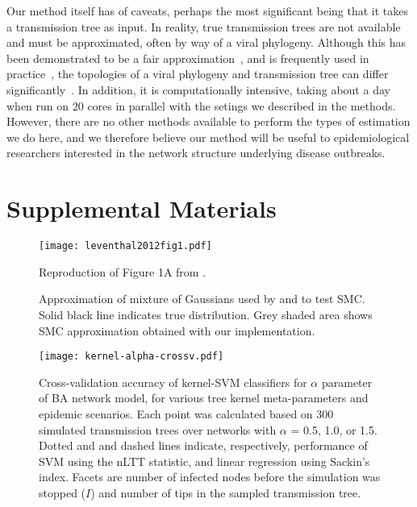 \documentclass[12pt]{article}\usepackage[]{graphicx}\usepackage[]{color}
\begin{document}
Our method itself has of caveats, perhaps the most significant being that it
takes a transmission tree as input. In reality, true transmission trees are not
available and must be approximated, often by way of a viral phylogeny. Although
this has been demonstrated to be a fair
approximation~\autocite[e.g.][]{leitner1996accurate}, and is frequently used in
practice~\autocite[e.g.][]{stadler2013uncovering}, the topologies of a viral
phylogeny and transmission tree can differ
significantly~\autocite{ypma2013relating}. In addition, it is computationally
intensive, taking about a day when run on 20 cores in parallel with the setings
we described in the methods. However, there are no other methods available to
perform the types of estimation we do here, and we therefore believe our method
will be useful to epidemiological researchers interested in the network
structure underlying disease outbreaks.

\setcounter{figure}{0}
\renewcommand{\thefigure}{S\arabic{figure}}

\printbibliography

\newpage
\section*{Supplemental Materials}

\begin{figure}[ht]
  \centering
  \texttt{[image: leventhal2012fig1.pdf]}
  \caption{Reproduction of Figure 1A from \textcite{leventhal2012inferring}.}
  \label{fig:sf1}
\end{figure}

\begin{figure}[ht]
  \centering
  \caption{Approximation of mixture of Gaussians used by
    \textcite{del2012adaptive} and \textcite{sisson2007sequential} to test
    \gls{SMC}. Solid black line indicates true distribution. Grey shaded area
    shows SMC approximation obtained with our implementation.}
  \label{fig:smctest}
\end{figure}

\begin{figure}[ht]
  \centering
  \texttt{[image: kernel-alpha-crossv.pdf]}
  \caption{
    Cross-validation accuracy of kernel-SVM classifiers for $\alpha$ parameter
    of \gls{BA} network model, for various tree kernel meta-parameters and
    epidemic scenarios. Each point was calculated based on 300 simulated
    transmission trees over networks with $\alpha$ = 0.5, 1.0, or 1.5. Dotted
    and and dashed lines indicate, respectively, performance of SVM using the
    \gls{nLTT} statistic, and linear regression using Sackin's index. Facets
    are number of infected nodes before the simulation was stopped ($I$) and
    number of tips in the sampled transmission tree.
  }
  \label{fig:alphacrossv}
\end{figure}
\end{document}
